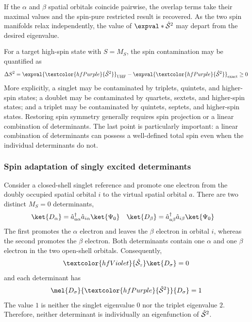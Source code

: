\documentclass[11pt,a4paper,titlepage]{article}
\numberwithin{equation}{section}
\newcommand{\chS}{\Hat{\mathcal{S}}}
\newcommand{\purple}[1]{\textcolor{hfPurple}{#1}}
\newcommand{\violet}[1]{\textcolor{hfViolet}{#1}}
\newcommand{\cre}[1]{\Hat{a}_{#1}^\dag}
\newcommand{\ani}[1]{\Hat{a}_{#1}}
\begin{document}
If the $\alpha$ and $\beta$ spatial orbitals coincide pairwise, the overlap
terms take their maximal values and the spin-pure restricted result is
recovered. As the two spin manifolds relax independently, the value of
$\expval*{\chS^2}$ may depart from the desired eigenvalue.

For a target high-spin state with $S=M_S$,
the spin contamination may be quantified as
\begin{equation}
  \Delta S^2
  =
  \expval{\purple{\chS^2}}_\text{UHF}
  -
  \expval{\purple{\chS^2}}_\text{exact}
  \geq0
\end{equation}
More explicitly, a singlet may be contaminated by triplets, quintets, and
higher-spin states; a doublet may be contaminated by quartets, sextets, and
higher-spin states; and a triplet may be contaminated by quintets, septets,
and higher-spin states. Restoring spin symmetry generally requires
spin projection or a linear combination of determinants.
The last point is particularly important: a linear combination of
determinants can possess a well-defined total spin even when the individual
determinants do not.


\subsubsection{Spin adaptation of singly excited determinants}

Consider a closed-shell singlet reference and promote one electron from the
doubly occupied spatial orbital $i$ to the virtual spatial orbital $a$.
There are two distinct $M_S=0$ determinants,
\begin{align}
  \ket{D_\alpha}
  & =
  \cre{a\alpha}\ani{i\alpha}\ket{\Psi_0}
  &
  \ket{D_\beta}
  & =
  \cre{a\beta}\ani{i\beta}\ket{\Psi_0}
  \label{eq:spin-adapted-determinants}
\end{align}
The first promotes the $\alpha$ electron and leaves the $\beta$ electron in
orbital $i$, whereas the second promotes the $\beta$ electron.
Both determinants contain one $\alpha$ and one $\beta$ electron in the two
open-shell orbitals. Consequently,
\begin{equation}
  \violet{\chS_z}\ket{D_\sigma}
  =
  0
\end{equation}
and each determinant has
\begin{equation}
  \mel{D_\sigma}{\purple{\chS^2}}{D_\sigma}
  =
  1
\end{equation}
The value $1$ is neither the singlet eigenvalue $0$ nor the triplet
eigenvalue $2$. Therefore, neither determinant is individually an
eigenfunction of $\chS^2$.
\end{document}
